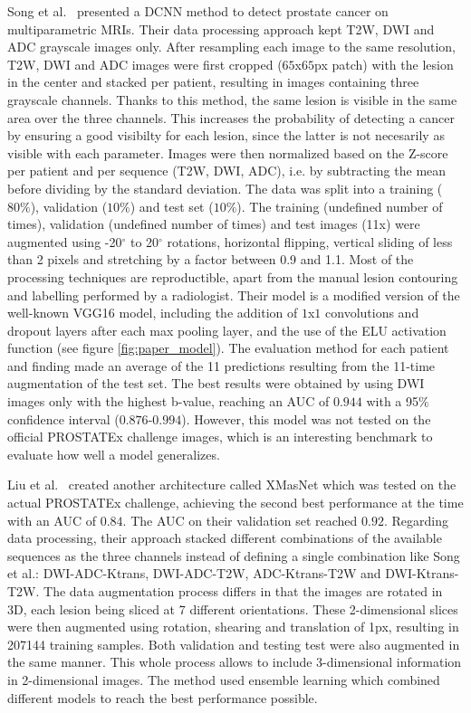 Song et al.~\cite{07} presented a DCNN method to detect prostate cancer on multiparametric MRIs. Their data processing approach kept T2W, DWI and ADC grayscale images only. After resampling each image to the same resolution, T2W, DWI and ADC images were first cropped ($65$x$65$px patch) with the lesion in the center and stacked per patient, resulting in images containing three grayscale channels. Thanks to this method, the same lesion is visible in the same area over the three channels. This increases the probability of detecting a cancer by ensuring a good visibilty for each lesion, since the latter is not necesarily as visible with each parameter. Images were then normalized based on the Z-score per patient and per sequence (T2W, DWI, ADC), i.e. by subtracting the mean before dividing by the standard deviation. The data was split into a training ($80\%$), validation ($10\%$) and test set ($10\%$). The training (undefined number of times), validation (undefined number of times) and test images (11x) were augmented using -20$^\circ$ to 20$^\circ$ rotations, horizontal flipping, vertical sliding of less than 2 pixels and stretching by a factor between 0.9 and 1.1. Most of the processing techniques are reproductible, apart from the manual lesion contouring and labelling performed by a radiologist. 
Their model is a modified version of the well-known VGG16 model, including the addition of $1$x$1$ convolutions and dropout layers after each max pooling layer, and the use of the ELU activation function (see figure \ref{fig:paper_model}). The evaluation method for each patient and finding made an average of the 11 predictions resulting from the 11-time augmentation of the test set. The best results were obtained by using DWI images only with the highest b-value, reaching an AUC of $0.944$ with a 95$\%$ confidence interval ($0.876$-$0.994$). However, this model was not tested on the official PROSTATEx challenge images, which is an interesting benchmark to evaluate how well a model generalizes.

Liu et al.~\cite{46} created another architecture called XMasNet which was tested on the actual PROSTATEx challenge, achieving the second best performance at the time with an AUC of $0.84$. The AUC on their validation set reached $0.92$. Regarding data processing, their approach stacked different combinations of the available sequences as the three channels instead of defining a single combination like Song et al.: DWI-ADC-Ktrans, DWI-ADC-T2W, ADC-Ktrans-T2W and DWI-Ktrans-T2W. The data augmentation process differs in that the images are rotated in 3D, each lesion being sliced at 7 different orientations. These 2-dimensional slices were then augmented using rotation, shearing and translation of 1px, resulting in 207144 training samples. Both validation and testing test were also augmented in the same manner. This whole process allows to include 3-dimensional information in 2-dimensional images. The method used ensemble learning which combined different models to reach the best performance possible. 

